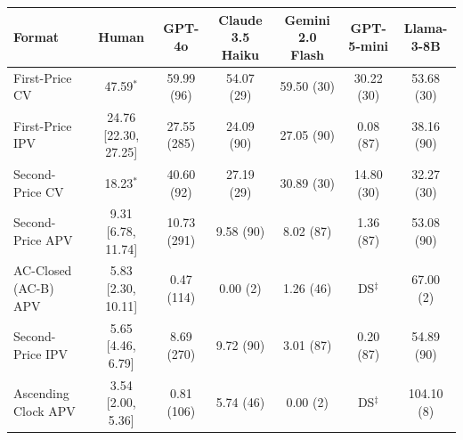 \begin{tabular}{lcccccc}
\toprule
Format & Human & GPT-4o & Claude 3.5 Haiku & Gemini 2.0 Flash & GPT-5-mini & Llama-3-8B \\
\midrule
First-Price CV & 47.59$^{\ast}$ & 59.99 {\scriptsize (96)} & 54.07 {\scriptsize (29)} & 59.50 {\scriptsize (30)} & 30.22 {\scriptsize (30)} & 53.68 {\scriptsize (30)} \\
First-Price IPV & 24.76 [22.30, 27.25] & 27.55 {\scriptsize (285)} & 24.09 {\scriptsize (90)} & 27.05 {\scriptsize (90)} & 0.08 {\scriptsize (87)} & 38.16 {\scriptsize (90)} \\
Second-Price CV & 18.23$^{\ast}$ & 40.60 {\scriptsize (92)} & 27.19 {\scriptsize (29)} & 30.89 {\scriptsize (30)} & 14.80 {\scriptsize (30)} & 32.27 {\scriptsize (30)} \\
Second-Price APV & 9.31 [6.78, 11.74] & 10.73 {\scriptsize (291)} & 9.58 {\scriptsize (90)} & 8.02 {\scriptsize (87)} & 1.36 {\scriptsize (87)} & 53.08 {\scriptsize (90)} \\
AC-Closed (AC-B) APV & 5.83 [2.30, 10.11] & 0.47 {\scriptsize (114)} & 0.00 {\scriptsize (2)} & 1.26 {\scriptsize (46)} & DS$^{\ddagger}$ & 67.00 {\scriptsize (2)} \\
Second-Price IPV & 5.65 [4.46, 6.79] & 8.69 {\scriptsize (270)} & 9.72 {\scriptsize (90)} & 3.01 {\scriptsize (87)} & 0.20 {\scriptsize (87)} & 54.89 {\scriptsize (90)} \\
Ascending Clock APV & 3.54 [2.00, 5.36] & 0.81 {\scriptsize (106)} & 5.74 {\scriptsize (46)} & 0.00 {\scriptsize (2)} & DS$^{\ddagger}$ & 104.10 {\scriptsize (8)} \\
\bottomrule
\end{tabular}
